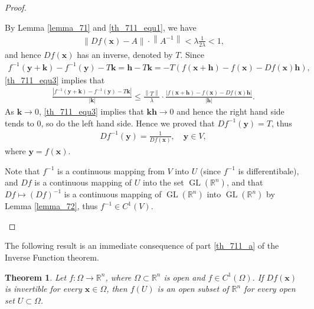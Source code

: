 \documentclass[11pt]{book}
\newtheorem{theorem}{Theorem}[chapter]
\theoremstyle{definition}
\numberwithin{equation}{chapter}
\begin{document}
\begin{proof}
\begin{enumerate}[label=(\alph*)]
    By Lemma \ref{lemma_71} and \eqref{th_711_equ1}, we have
    \begin{align*}
        \left\|Df(\mathbf{x}) - A\right\| \cdot \left\|A^{-1}\right\| < \lambda \frac{1}{2\lambda} < 1,
    \end{align*}
    and hence $Df(\mathbf{x})$ has an inverse, denoted by $T$. Since 
    \begin{align*}
        f^{-1}(\mathbf{y} + \mathbf{k}) - f^{-1}(\mathbf{y}) - T \mathbf{k} = \mathbf{h} - T \mathbf{k} = -T \left(f(\mathbf{x} + \mathbf{h}) - f(\mathbf{x}) - Df(\mathbf{x}) \mathbf{h}\right),
    \end{align*}
    \eqref{th_711_equ3} implies that
    \begin{align*}
        \frac{\left|f^{-1}(\mathbf{y} + \mathbf{k}) - f^{-1}(\mathbf{y}) - T \mathbf{k}\right|}{\left|\mathbf{k}\right|} \leq \frac{\left\|T\right\|}{\lambda} \cdot \frac{\left|f(\mathbf{x} + \mathbf{h}) - f(\mathbf{x}) - Df(\mathbf{x}) \mathbf{h}\right|}{\left|\mathbf{h}\right|}.
    \end{align*}
    As $\mathbf{k} \to 0$, \eqref{th_711_equ3} implies that $\mathbf{kh} \to 0$ and hence the right hand side tends to $0$, so do the left hand side. Hence we proved that $Df^{-1}(\mathbf{y}) = T$, thus
    \begin{align*}
        Df^{-1}(\mathbf{y}) = \frac{1}{Df(\mathbf{x})}, \quad \mathbf{y} \in V,
    \end{align*}
    where $\mathbf{y} = f(\mathbf{x})$.
    
    Note that $f^{-1}$ is a continuous mapping from $V$ into $U$ (since $f^{-1}$ is differentibale), and $Df$ is a continuous mapping of $U$ into the set $\operatorname{GL}(\mathbb{R}^n)$, and that $Df \mapsto \left(Df\right)^{-1}$ is a continuous mapping of $\operatorname{GL}(\mathbb{R}^n)$ into $\operatorname{GL}(\mathbb{R}^n)$ by Lemma \ref{lemma_72}, thus $f^{-1} \in C^1(V)$.
\end{enumerate}
\end{proof}

\medskip

The following result is an immediate consequence of part \ref{th_711_a} of the Inverse Function theorem.

\medskip

\begin{theorem}
Let $f: \Omega \to \mathbb{R}^n$, where $\Omega \subset \mathbb{R}^n$ is open and $f \in C^1(\Omega)$. If $Df(\mathbf{x})$ is invertible for every $\mathbf{x} \in \Omega$, then $f(U)$ is an open subset of $\mathbb{R}^n$ for every open set $U \subset \Omega$.
\end{theorem}
\end{document}
